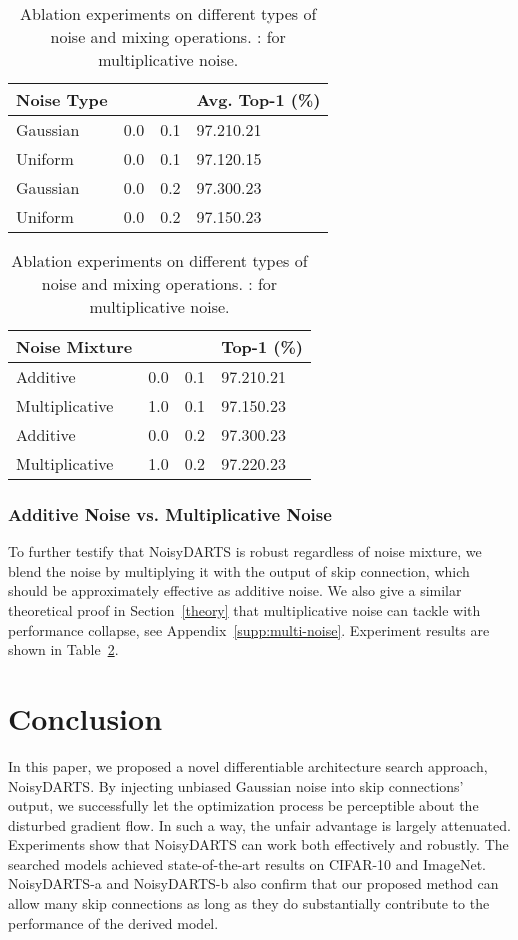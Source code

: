\documentclass{article}
\begin{document}
\begin{table}[ht]
	\begin{center}
		\caption{Ablation experiments on different types of noise and mixing operations. :  for multiplicative noise.}
		\label{table:ablation-noise-type}
		\begin{tabular}{*{4}{l}}
		\toprule
		Noise Type &   &   & Avg. Top-1 (\%)\\
		\midrule
		Gaussian & 0.0 &  0.1 &  97.210.21 \\ Uniform & 0.0 &  0.1 & 97.120.15  \\ \midrule
		Gaussian &  0.0  & 0.2 &  97.300.23 \\ Uniform &  0.0 & 0.2  & 97.150.23 \\ \bottomrule
		\end{tabular}
		\quad
		\begin{tabular}{*{4}{l}}
		\toprule
		Noise Mixture &   &   & Top-1 (\%)\\
		\midrule
		Additive &  0.0 & 0.1  & 97.210.21  \\ Multiplicative & 1.0 & 0.1  & 97.150.23 \\ \midrule
		Additive  & 0.0 & 0.2 & 97.300.23 \\Multiplicative & 1.0 & 0.2 & 97.220.23  \\ \bottomrule
		\end{tabular}
	\end{center}
\end{table}

\subsubsection{Additive Noise vs. Multiplicative Noise}
To further testify that NoisyDARTS is robust regardless of noise mixture, we blend the noise by multiplying it with the output  of skip connection, which should be approximately effective as additive noise. We also give a similar theoretical proof in Section~\ref*{theory} that multiplicative noise can  tackle with performance collapse, see Appendix~\ref{supp:multi-noise}. Experiment results are shown in Table~\ref{table:ablation-noise-type}.
\section{Conclusion}


In this paper, we proposed a novel differentiable architecture search approach, NoisyDARTS. By injecting unbiased Gaussian noise into skip connections' output, we successfully let the optimization process be perceptible about the disturbed gradient flow. In such a way, the unfair advantage is largely attenuated. Experiments show that NoisyDARTS can work both effectively and robustly. The searched models achieved state-of-the-art results on CIFAR-10 and ImageNet. NoisyDARTS-a and NoisyDARTS-b also confirm that our proposed method can allow many skip connections as long as they do substantially contribute to the performance of the derived model.
\end{document}

